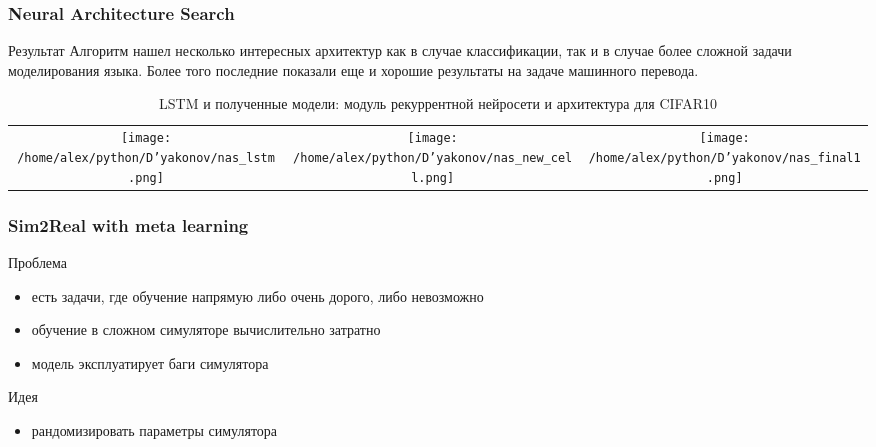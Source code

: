 \documentclass[fleqn, xcolor=x11names]{beamer}
\begin{document}
\begin{frame}\frametitle{Neural Architecture Search}




\begin{block}{Результат}
{\footnotesize Алгоритм нашел несколько интересных архитектур как в случае классификации, так и в случае более сложной задачи моделирования языка. Более того последние показали еще и хорошие результаты на задаче машинного перевода.}
\end{block}

\begin{table}[h]
\begin{center}
\begin{tabular}{*{3}{c}}

\texttt{[image: /home/alex/python/D'yakonov/nas\_lstm.png]} &
\texttt{[image: /home/alex/python/D'yakonov/nas\_new\_cell.png]} &
\texttt{[image: /home/alex/python/D'yakonov/nas\_final1.png]} \\

\end{tabular}
\caption{{\footnotesize LSTM и полученные модели: модуль рекуррентной нейросети и архитектура для CIFAR10}}
\end{center}
\end{table}

\end{frame}

\begin{frame}\frametitle{Sim2Real with meta learning}

\begin{block}{{\footnotesize Проблема}}
{\footnotesize 
\begin{itemize}
\item есть задачи, где обучение напрямую либо очень дорого, либо невозможно
\item обучение в сложном симуляторе  вычислительно затратно
\item модель эксплуатирует баги симулятора
\end{itemize} 
}
\end{block}

\begin{block}{{\footnotesize Идея}}
{\footnotesize 
\begin{itemize}
\item рандомизировать параметры симулятора
\end{itemize}
}
{\footnotesize }

\end{block}

\end{frame}
\end{document}
